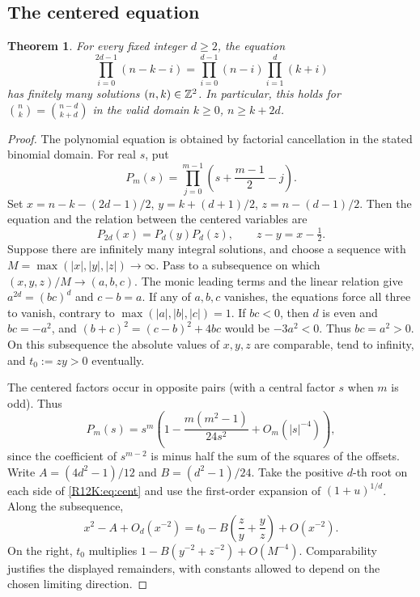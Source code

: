 \documentclass[11pt,a4paper]{article}
\newtheorem{SourceRbcKtheorem}{Theorem}
\begin{document}
\subsection{The centered equation}
\begin{SourceRbcKtheorem}\label{R12K:thm:finite}
For every fixed integer \(d\ge2\), the equation
\[
\prod_{i=0}^{2d-1}(n-k-i) =
 \prod_{i=0}^{d-1}(n-i)\prod_{i=1}^d(k+i)
\]
has finitely many solutions \((n,k)\in\mathbb Z^2\). In particular, this holds for \(\binom nk=\binom{n-d}{k+d}\) in the valid domain \(k\ge0\), \(n\ge k+2d\).
\end{SourceRbcKtheorem}

\begin{proof}
The polynomial equation is obtained by factorial cancellation in the stated binomial domain. For real \(s\), put
\[
P_m(s)=\prod_{j=0}^{m-1}\left(s+\frac{m-1}{2}-j\right).
\]
Set \(x=n-k-(2d-1)/2\), \(y=k+(d+1)/2\), \(z=n-(d-1)/2\). Then the equation and the relation between the centered variables are
\begin{equation}\label{R12K:eq:cent}
 P_{2d}(x)=P_d(y)P_d(z), \qquad z-y=x-\tfrac12 .
\end{equation}
Suppose there are infinitely many integral solutions, and choose a sequence with \(M=\max(|x|,|y|,|z|)\to\infty\). Pass to a subsequence on which \((x,y,z)/M\to(a,b,c)\). The monic leading terms and the linear relation give \(a^{2d}=(bc)^d\) and \(c-b=a\). If any of \(a,b,c\) vanishes, the equations force all three to vanish, contrary to \(\max(|a|,|b|,|c|)=1\). If \(bc<0\), then \(d\) is even and \(bc=-a^2\), and \((b+c)^2=(c-b)^2+4bc\) would be \(-3a^2<0\). Thus \(bc=a^2>0\). On this subsequence the absolute values of \(x,y,z\) are comparable, tend to infinity, and \(t_0:=zy>0\) eventually.

The centered factors occur in opposite pairs (with a central factor \(s\) when \(m\) is odd). Thus
\[
P_m(s)=s^m\left(1-\frac{m(m^2-1)}{24s^2}+O_m(|s|^{-4})\right),
\]
since the coefficient of \(s^{m-2}\) is minus half the sum of the squares of the offsets. Write \(A=(4d^2-1)/12\) and \(B=(d^2-1)/24\). Take the positive \(d\)-th root on each side of \eqref{R12K:eq:cent} and use the first-order expansion of \((1+u)^{1/d}\). Along the subsequence,
\[
 x^2-A+O_d(x^{-2})=
 t_0-B\!\left(\frac{z}{y}+\frac{y}{z}\right)+O(x^{-2}).
\]
On the right, \(t_0\) multiplies \(1-B(y^{-2}+z^{-2})+O(M^{-4})\). Comparability justifies the displayed remainders, with constants allowed to depend on the chosen limiting direction.


\end{proof}
\end{document}

